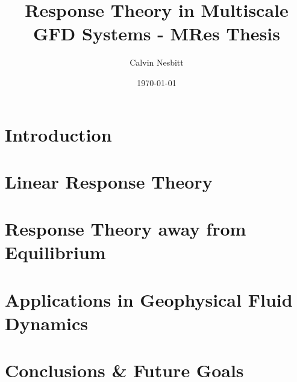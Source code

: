 \documentclass[11pt,letterpaper,oneside,openright]{report}
\title{Response Theory in Multiscale GFD Systems - MRes Thesis}
\date{\today}
\author{Calvin Nesbitt}
\begin{document}
\maketitle

\tableofcontents 

\cleardoublepage

\chapter{Introduction}

\chapter{Linear Response Theory} \label{Chapter:LRT}





\chapter{Response Theory away from Equilibrium}





\chapter{Applications in Geophysical Fluid Dynamics} \label{Chapter Applications}




\chapter{Conclusions \& Future Goals}

\clearpage 

\end{document}

